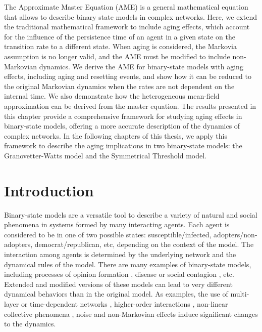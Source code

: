 The Approximate Master Equation (AME) is a general mathematical equation that allows to describe binary state models in complex networks. Here, we extend the traditional mathematical framework to include aging effects, which account for the influence of the persistence time of an agent in a given state on the transition rate to a different state. When aging is considered, the Markovia assumption is no longer valid, and the AME must be modified to include non-Markovian dynamics. We derive the AME for binary-state models with aging effects, including aging and resetting events, and show how it can be reduced to the original Markovian dynamics when the rates are not dependent on the internal time. We also demonstrate how the heterogeneous mean-field approximation can be derived from the master equation. The results presented in this chapter provide a comprehensive framework for studying aging effects in binary-state models, offering a more accurate description of the dynamics of complex networks. In the following chapters of this thesis, we apply this framework to describe the aging implications in two binary-state models: the Granovetter-Watts model and the Symmetrical Threshold model.

\section{\label{sec:Introduction_binary} Introduction}

Binary-state models are a versatile tool to describe a variety of natural and social phenomena in systems formed by many interacting agents. Each agent is considered to be in one of two possible states: susceptible/infected, adopters/non-adopters, democrat/republican, etc, depending on the context of the model. The interaction among agents is determined by the underlying network and the dynamical rules of the model. There are many examples of binary-state models, including processes of opinion formation \cite{Voter-original,sood-2005,fernandez-gracia-2014,redner-2019}, disease or social contagion \cite{granovetter-1978,pastor-satorras-2015}, etc. Extended and modified versions of these models can lead to very different dynamical behaviors than in the original model. As examples, the use of multi-layer  \cite{diakonova-2014,diakonova-2016,amato-2017} or time-dependent networks \cite{vazquez-2008}, higher-order interactions \cite{de-arruda-2020, iacopini-2019, cencetti-2021}, non-linear collective phenomena \cite{castellano-2009,peralta-2018}, noise \cite{carro-2016} and non-Markovian \cite{van-mieghem-2013,starnini-2017,peralta-2020A,chen-2020} effects induce significant changes to the dynamics.

